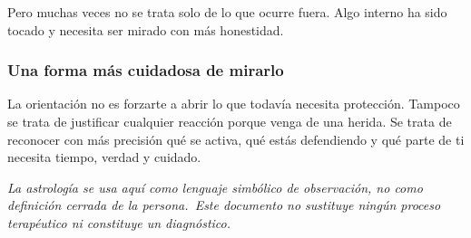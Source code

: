 \documentclass[11pt,a4paper]{article}
\begin{document}
Pero muchas veces no se trata solo de lo que ocurre fuera. Algo interno ha sido tocado y necesita ser mirado con más honestidad.

\subsubsection*{Una forma más cuidadosa de mirarlo}
La orientación no es forzarte a abrir lo que todavía necesita protección. Tampoco se trata de justificar cualquier reacción porque venga de una herida. Se trata de reconocer con más precisión qué se activa, qué estás defendiendo y qué parte de ti necesita tiempo, verdad y cuidado.

\vspace{1cm}
\begin{center}
{\small\itshape\color{grisai}
La astrología se usa aquí como lenguaje simbólico de observación, no como definición cerrada de la persona.\
Este documento no sustituye ningún proceso terapéutico ni constituye un diagnóstico.
}
\end{center}
\end{document}
